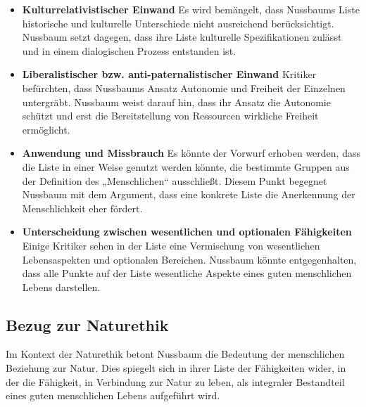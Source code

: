 \documentclass{article}
\begin{document}
\begin{itemize}
	\item \textbf{Kulturrelativistischer Einwand}
	      Es wird bemängelt, dass Nussbaums Liste historische und kulturelle Unterschiede nicht ausreichend berücksichtigt. Nussbaum setzt dagegen, dass ihre Liste kulturelle Spezifikationen zulässt und in einem dialogischen Prozess entstanden ist.

	\item \textbf{Liberalistischer bzw. anti-paternalistischer Einwand}
	      Kritiker befürchten, dass Nussbaums Ansatz Autonomie und Freiheit der Einzelnen untergräbt. Nussbaum weist darauf hin, dass ihr Ansatz die Autonomie schützt und erst die Bereitstellung von Ressourcen wirkliche Freiheit ermöglicht.

	\item \textbf{Anwendung und Missbrauch}
	      Es könnte der Vorwurf erhoben werden, dass die Liste in einer Weise genutzt werden könnte, die bestimmte Gruppen aus der Definition des „Menschlichen“ ausschließt. Diesem Punkt begegnet Nussbaum mit dem Argument, dass eine konkrete Liste die Anerkennung der Menschlichkeit eher fördert.

	\item \textbf{Unterscheidung zwischen wesentlichen und optionalen Fähigkeiten}
	      Einige Kritiker sehen in der Liste eine Vermischung von wesentlichen Lebensaspekten und optionalen Bereichen. Nussbaum könnte entgegenhalten, dass alle Punkte auf der Liste wesentliche Aspekte eines guten menschlichen Lebens darstellen.
\end{itemize}

\subsection*{Bezug zur Naturethik}

Im Kontext der Naturethik betont Nussbaum die Bedeutung der menschlichen Beziehung zur Natur. Dies spiegelt sich in ihrer Liste der Fähigkeiten wider, in der die Fähigkeit, in Verbindung zur Natur zu leben, als integraler Bestandteil eines guten menschlichen Lebens aufgeführt wird.
\end{document}

